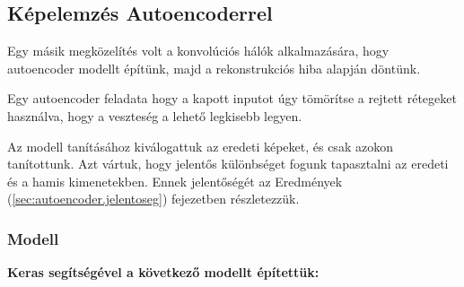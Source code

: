 %
%
%
%
%
%
%
%
%





\subsection{Képelemzés Autoencoderrel}
\label{sec:autoencoder}

Egy másik megközelítés volt a konvolúciós hálók alkalmazására, hogy autoencoder modellt 
építünk, majd a rekonstrukciós hiba alapján döntünk.

Egy autoencoder feladata hogy a kapott inputot úgy tömörítse a rejtett rétegeket
használva, hogy a veszteség a lehető legkisebb legyen.

Az modell tanításához kiválogattuk az eredeti képeket, és csak azokon tanítottunk.
Azt vártuk, hogy jelentős különbséget fogunk tapasztalni az eredeti és a hamis 
kimenetekben. Ennek jelentőségét az Eredmények (\ref{sec:autoencoder.jelentoseg}) fejezetben részletezzük. 


\subsubsection{Modell}
\noindent
\textbf{Keras segítségével a következő modellt építettük:}


